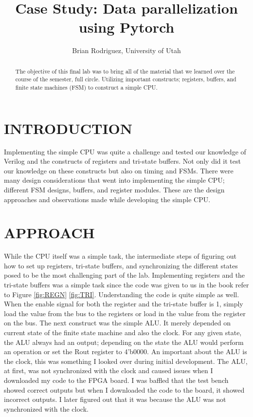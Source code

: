 \documentclass[10pt,conference]{ieeeconf}
\begin{document}
\title{Case Study: Data parallelization using Pytorch}
\author{Brian Rodriguez, University of Utah}
\maketitle

\begin{abstract}
	The objective of this final lab was to bring all of the material that we learned over the course of the semester, full circle. Utilizing important constructs; registers, buffers, and finite state machines (FSM) to construct a simple CPU.
\end{abstract}

\section{INTRODUCTION}
	Implementing the simple CPU was quite a challenge and tested our knowledge of Verilog and the constructs of registers and tri-state buffers. Not only did it test our knowledge on these constructs but also on timing and FSMs. There were many design considerations that went into implementing the simple CPU; different FSM designs, buffers, and register modules. These are the design approaches and observations made while developing the simple CPU.

\section{APPROACH}
	While the CPU itself was a simple task, the intermediate steps of figuring out how to set up registers, tri-state buffers, and synchronizing the different states posed to be the most challenging part of the lab. Implementing registers and the tri-state buffers was a simple task since the code was given to us in the book refer to Figure \ref{fig:REGN} \ref{fig:TRI}. Understanding the code is quite simple as well. When the enable signal for both the register and the tri-state buffer is 1, simply load the value from the bus to the registers or load in the value from the register on the bus. The next construct was the simple ALU. It merely depended on current state of the finite state machine and also the clock. For any given state, the ALU always had an output; depending on the state the ALU would perform an operation or set the Rout register to 4'b0000. An important about the ALU is the clock, this was something I looked over during initial development. The ALU, at first, was not synchronized with the clock and caused issues when I downloaded my code to the FPGA board. I was baffled that the test bench showed correct outputs but when I downloaded the code to the board, it showed incorrect outputs. I later figured out that it was because the ALU was not synchronized with the clock.
\end{document}
